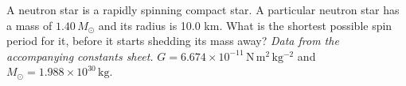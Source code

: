 A neutron star is a rapidly spinning compact star. A particular neutron star has a mass of $1.40\,M_\odot$
and its radius is 10.0 km. What is the shortest possible spin period for it, before it starts shedding its mass away?
\textit{Data from the accompanying constants sheet.}
$G=6.674\times10^{-11}\,\mathrm{N\,m^2\,kg^{-2}}$ and $M_\odot=1.988\times10^{30}\,\mathrm{kg}$.
